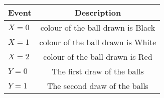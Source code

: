 \begin{tabular}{|l|c|}
	\hline
	\textbf{Event} & \textbf{Description} \\
	\hline
	$X = 0$ &  colour of the ball drawn is Black \\
	\hline
	$X = 1$ &  colour of the ball drawn is White \\
	\hline
	$X = 2$ &  colour of the ball drawn is Red \\
	\hline
	$Y = 0$ &  The first draw of the balls \\
	\hline
	$Y = 1$ &  The second draw of the balls \\
	\hline
\end{tabular}
